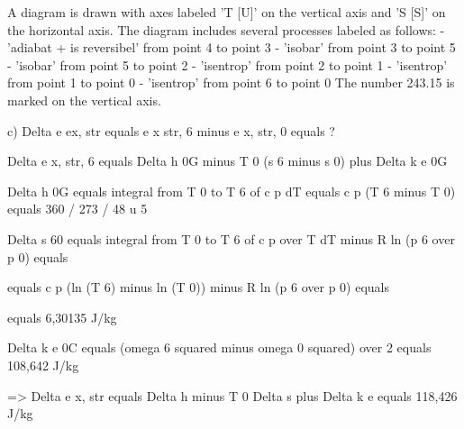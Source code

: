 A diagram is drawn with axes labeled 'T [U]' on the vertical axis and 'S [S]' on the horizontal axis. The diagram includes several processes labeled as follows:
- 'adiabat + is reversibel' from point 4 to point 3
- 'isobar' from point 3 to point 5
- 'isobar' from point 5 to point 2
- 'isentrop' from point 2 to point 1
- 'isentrop' from point 1 to point 0
- 'isentrop' from point 6 to point 0
The number 243.15 is marked on the vertical axis.

c) Delta e ex, str equals e x str, 6 minus e x, str, 0 equals ?

Delta e x, str, 6 equals Delta h 0G minus T 0 (s 6 minus s 0) plus Delta k e 0G

Delta h 0G equals integral from T 0 to T 6 of c p dT equals c p (T 6 minus T 0) equals 360 / 273 / 48 u 5

Delta s 60 equals integral from T 0 to T 6 of c p over T dT minus R ln (p 6 over p 0) equals

equals c p (ln (T 6) minus ln (T 0)) minus R ln (p 6 over p 0) equals

equals 6,30135 J/kg

Delta k e 0C equals (omega 6 squared minus omega 0 squared) over 2 equals 108,642 J/kg

=> Delta e x, str equals Delta h minus T 0 Delta s plus Delta k e equals 118,426 J/kg